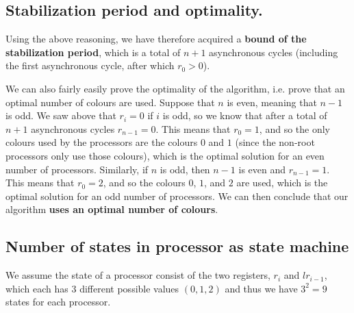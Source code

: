 \documentclass{article}
\begin{document}
\subsection*{Stabilization period and optimality.}
Using the above reasoning, we have therefore acquired a \textbf{bound of the stabilization period}, which is a total of $n + 1$ asynchronous cycles (including the first asynchronous cycle, after which $r_0 > 0$).

We can also fairly easily prove the optimality of the algorithm, i.e. prove that an optimal number of colours are used. Suppose that $n$ is even, meaning that $n - 1$ is odd. We saw above that $r_i = 0$ if $i$ is odd, so we know that after a total of $n + 1$ asynchronous cycles $r_{n - 1} = 0$. This means that $r_0 = 1$, and so the only colours used by the processors are the colours $0$ and $1$ (since the non-root processors only use those colours), which is the optimal solution for an even number of processors. Similarly, if $n$ is odd, then $n - 1$ is even and $r_{n - 1} = 1$. This means that $r_0 = 2$, and so the colours $0$, $1$, and $2$ are used, which is the optimal solution for an odd number of processors. We can then conclude that our algorithm \textbf{uses an optimal number of colours}.

\subsection*{Number of states in processor as state machine}
We assume the state of a processor consist of the two registers, $r_i$ and $lr_{i-1}$, which each has $3$ different possible values $(0, 1, 2)$ and thus we have $3^2 = 9$ states for each processor.
\end{document}
